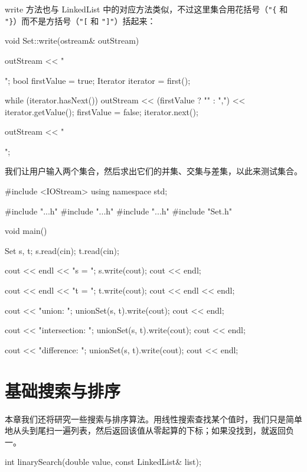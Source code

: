 write 方法也与 LinkedList 中的对应方法类似，不过这里集合用花括号（\texttt{"\{} 和 \texttt{"\}}）而不是方括号（\texttt{"[} 和 \texttt{"]"}）括起来：

\begin{codebox}
void Set::write(ostream& outStream) {
  outStream << "{";
  bool firstValue = true;
  Iterator iterator = first();

  while (iterator.hasNext()) {
    outStream << (firstValue ? "" : ",") << iterator.getValue();
    firstValue = false;
    iterator.next();
  }

  outStream << "}";
}
\end{codebox}

我们让用户输入两个集合，然后求出它们的并集、交集与差集，以此来测试集合。

\medskip{}

\begin{codebox}
#include <IOStream>
using namespace std;

#include "..\ListBasic\Cell.h"
#include "..\ListBasic\Iterator.h"
#include "..\ListBasic\List.h"
#include "Set.h"

void main() {
  Set s, t;
  s.read(cin);
  t.read(cin);

  cout << endl << "s = ";
  s.write(cout);
  cout << endl;

  cout << endl << "t = ";
  t.write(cout);
  cout << endl << endl;

  cout << "union: ";
  unionSet(s, t).write(cout);
  cout << endl;

  cout << "intersection: ";
  unionSet(s, t).write(cout);
  cout << endl;

  cout << "difference: ";
  unionSet(s, t).write(cout);
  cout << endl;
}
\end{codebox}

\section{基础搜索与排序}

本章我们还将研究一些搜索与排序算法。用线性搜索查找某个值时，我们只是简单地从头到尾扫一遍列表，然后返回该值从零起算的下标；如果没找到，就返回负一。

\medskip{}

\begin{codebox}
int linarySearch(double value, const LinkedList& list);
\end{codebox}

